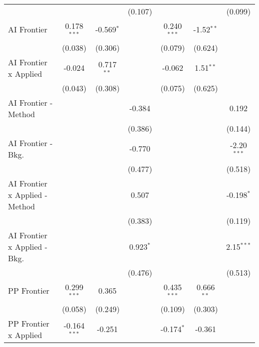 \begin{tabular}{lcccccc}
                                  &                &               & (0.107)        &                &               & (0.099)\\   
   AI Frontier                    & 0.178$^{***}$  & -0.569$^{*}$  &                & 0.240$^{***}$  & -1.52$^{**}$  &   \\   
                                  & (0.038)        & (0.306)       &                & (0.079)        & (0.624)       &   \\   
   AI Frontier x Applied          & -0.024         & 0.717$^{**}$  &                & -0.062         & 1.51$^{**}$   &   \\   
                                  & (0.043)        & (0.308)       &                & (0.075)        & (0.625)       &   \\   
   AI Frontier - Method           &                &               & -0.384         &                &               & 0.192\\   
                                  &                &               & (0.386)        &                &               & (0.144)\\   
   AI Frontier - Bkg.             &                &               & -0.770         &                &               & -2.20$^{***}$\\   
                                  &                &               & (0.477)        &                &               & (0.518)\\   
   AI Frontier x Applied - Method &                &               & 0.507          &                &               & -0.198$^{*}$\\   
                                  &                &               & (0.383)        &                &               & (0.119)\\   
   AI Frontier x Applied - Bkg.   &                &               & 0.923$^{*}$    &                &               & 2.15$^{***}$\\   
                                  &                &               & (0.476)        &                &               & (0.513)\\   
   PP Frontier                    & 0.299$^{***}$  & 0.365         &                & 0.435$^{***}$  & 0.666$^{**}$  &   \\   
                                  & (0.058)        & (0.249)       &                & (0.109)        & (0.303)       &   \\   
   PP Frontier x Applied          & -0.164$^{***}$ & -0.251        &                & -0.174$^{*}$   & -0.361        &   \\   

\end{tabular}
